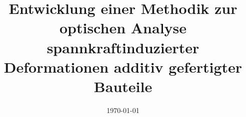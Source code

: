 \documentclass[t, aspectratio=169]{beamer}
\begin{document}
\title[]{Entwicklung einer Methodik zur optischen Analyse spannkraftinduzierter Deformationen additiv gefertigter Bauteile}
\date{\today}
\begin{frame}
  \vspace{2cm}
  \maketitle
  \vspace{1.5cm}  
\end{frame}








\end{document}
